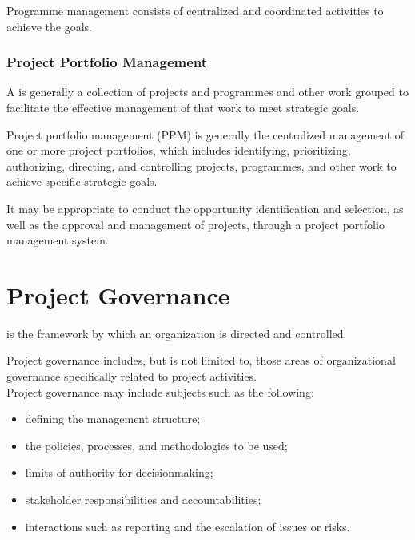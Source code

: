 \documentclass[letterpaper,10pt,english]{jupyterBook}
\begin{document}
\sphinxAtStartPar
Programme management consists of centralized and coordinated activities to achieve the goals.


\subsubsection{Project Portfolio Management}
\label{\detokenize{PM/pm-concepts:project-portfolio-management}}
\sphinxAtStartPar
A  is generally a collection of projects and programmes and other work grouped to facilitate the effective management of that work to meet strategic goals.

\sphinxAtStartPar
Project portfolio management (PPM) is generally the centralized management of one or more project portfolios, which includes identifying, prioritizing,
authorizing, directing, and controlling projects, programmes, and other work to achieve specific strategic goals.

\sphinxAtStartPar
It may be appropriate to conduct the opportunity identification and selection, as well as the approval and management of projects, through a project portfolio management system.


\section{Project Governance}
\label{\detokenize{PM/pm-concepts:project-governance}}
\sphinxAtStartPar
{} is the framework by which an organization is directed and controlled.

\sphinxAtStartPar
Project governance includes, but is not limited to, those areas of organizational governance specifically related to project activities. \\
Project governance may include subjects such as the following:
\begin{itemize}
\item {} 
\sphinxAtStartPar
defining the management structure;

\item {} 
\sphinxAtStartPar
the policies, processes, and methodologies to be used;

\item {} 
\sphinxAtStartPar
limits of authority for decision\sphinxhyphen{}making;

\item {} 
\sphinxAtStartPar
stakeholder responsibilities and accountabilities;

\item {} 
\sphinxAtStartPar
interactions such as reporting and the escalation of issues or risks.

\end{itemize}
\end{document}
